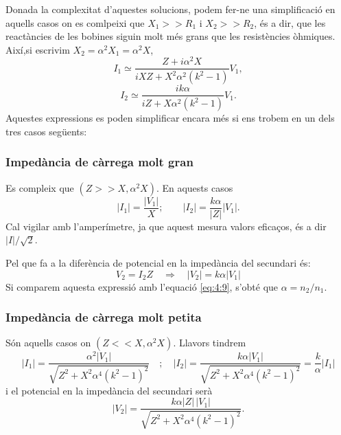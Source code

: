 \documentclass[a4paper,10.5pt]{report}
\begin{document}
Donada la complexitat d'aquestes solucions, podem fer-ne una simplificació en aquells casos on es comlpeixi que $X_1 >> R_1$ i $X_2 >> R_2$, és a dir, que les reactàncies de les bobines siguin molt més grans que les resistències òhmiques. Així,si escrivim $X_2 = \alpha^2 X_1 = \alpha^2 X$,
\begin{equation}
	I_1 \simeq \frac{Z + i\alpha^2 X}{iX Z + X^2 \alpha^2 (k^2 - 1)} V_1, \label{eq4:17}
\end{equation}
\begin{equation}
	I_2 \simeq \frac{i k \alpha}{iZ + X \alpha^2 (k^2 - 1)} V_1. \label{eq4:18}
\end{equation}
Aquestes expressions es poden simplificar encara més si ens trobem en un dels tres casos següents:
\subsubsection{Impedància de càrrega molt gran}
Es compleix que $(Z >> X,\alpha^2X)$. En aquests casos
\begin{equation}
	|I_1| =  \frac{|V_1|}{X}  ; \qquad |I_2| = \frac{k \alpha}{|Z|} |V_1|.
	\label{eq4:19}
\end{equation}
Cal vigilar amb l'amperímetre, ja que aquest mesura valors eficaços, és a dir $|I|/\sqrt{2}$.

Pel que fa a la diferència de potencial en la impedància del secundari és:
\begin{equation}
	V_2 = I_2 Z \quad \Longrightarrow \quad |V_2| = k \alpha |V_1|
	\label{eq4:20}
\end{equation}
Si comparem aquesta expressió amb l'equació \eqref{eq:4:9}, s'obté que $\alpha = n_2/n_1$.
\subsubsection{Impedància de càrrega molt petita}
Són aquells casos on $(Z << X,\alpha^2X)$. Llavors tindrem
\begin{equation}
	|I_1| = \frac{\alpha^2 |V_1|}{\sqrt{Z^2 + X^2 \alpha^4 (k^2 - 1)^2}} \quad ; \quad
	|I_2| = \frac{k \alpha |V_1|}{\sqrt{Z^2 + X^2 \alpha^4 (k^2 - 1)^2}} = \frac{k}{\alpha} |I_1|
	\label{eq4:21}
\end{equation}
i el potencial en la impedància del secundari serà
\begin{equation}
	|V_2| = \frac{k \alpha |Z| \, |V_1|}{\sqrt{Z^2 + X^2 \alpha^4 (k^2 - 1)^2}}.
	\label{eq4:22}
\end{equation}
\end{document}
